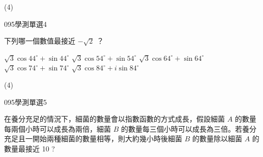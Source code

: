 \begin{QUESTIONS}
\begin{QUESTION}
\begin{QANS}
            (4)
        \end{QANS}
        \begin{QSOLLIST}
        \end{QSOLLIST}
        \begin{QEMPTYSPACE}
        \end{QEMPTYSPACE}
    \end{QUESTION}
    \begin{QUESTION}
        \begin{ExamInfo}{095}{學測}{單選}{4}
        \end{ExamInfo}
        \begin{ExamAnsRateInfo}{34}{67}{23}{12}
        \end{ExamAnsRateInfo}
        \begin{QBODY}
			下列哪一個數值最接近 $-\sqrt{2}$ ？ 
			\begin{QOPS} 
				\QOP $\sqrt{3}\cos{44^\circ}+ \sin{44^\circ}$ 
				\QOP $\sqrt{3}\cos{54^\circ}+ \sin{54^\circ}$ 
				\QOP $\sqrt{3}\cos{64^\circ} +\sin{64^\circ}$
				\QOP $\sqrt{3}\cos{74^\circ}+\sin{74^\circ}$
				\QOP $\sqrt{3}\cos{84^\circ}+i\sin{84^\circ}$
			\end{QOPS}
        \end{QBODY}
        \begin{QFROMS}
        \end{QFROMS}
        \begin{QTAGS}\end{QTAGS}
        \begin{QANS}
            (4)
        \end{QANS}
        \begin{QSOLLIST}
        \end{QSOLLIST}
        \begin{QEMPTYSPACE}
        \end{QEMPTYSPACE}
    \end{QUESTION}
    \begin{QUESTION}
        \begin{ExamInfo}{095}{學測}{單選}{5}
        \end{ExamInfo}
        \begin{ExamAnsRateInfo}{24}{50}{15}{7}
        \end{ExamAnsRateInfo}
        \begin{QBODY}
			在養分充足的情況下，細菌的數量會以指數函數的方式成長，假設細菌 $A$ 的數量每兩個小時可以成長為兩倍，細菌 $B$ 的數量每三個小時可以成長為三倍。若養分充足且一開始兩種細菌的數量相等，則大約幾小時後細菌 $B$ 的數量除以細菌 $A$ 的數量最接近 10 ? 

\end{QBODY}
\end{QUESTION}
\end{QUESTIONS}
